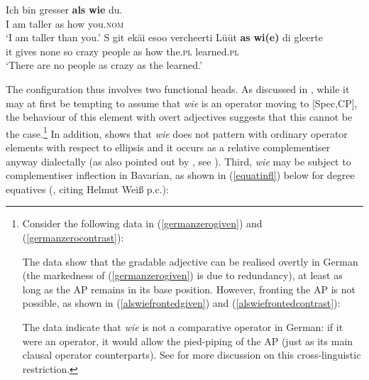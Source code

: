 \ea \label{alswiedistr}
\ea \gll Ich bin gresser \textbf{als} \textbf{wie} du.\\
I am taller as how you.\textsc{nom}\\
\glt `I am taller than you.'
\ex \gll S git ekäi esoo vercheerti Lüüt \textbf{as} \textbf{wi(e)} di gleerte\\
it gives none so crazy people as how the.\textsc{pl} learned.\textsc{pl}\\
\glt `There are no people as crazy as the learned.'
\z
\z

The configuration thus involves two functional heads. As discussed in , while it may at first be tempting to assume that \textit{wie} is an operator moving to [Spec,CP], the behaviour of this element with overt adjectives suggests that this cannot be the case.\footnote{Consider the following data in (\ref{germanzerogiven}) and (\ref{germanzerocontrast}):

\z

The data show that the gradable adjective can be realised overtly in German (the markedness of (\ref{germanzerogiven}) is due to redundancy), at least as long as the AP remains in its base position. However, fronting the AP is not possible, as shown in (\ref{alswiefrontedgiven}) and (\ref{alswiefrontedcontrast}):

\z

The data indicate that \textit{wie} is not a comparative operator in German: if it were an operator, it would allow the pied-piping of the AP (just as its main clausal operator counterparts). See \citet[92--100]{bacskaiatkari2018langsci} for more discussion on this cross-linguistic restriction.} In addition, \citet[467--470]{jaeger2018} shows that \textit{wie} does not pattern with ordinary operator elements with respect to ellipsis and it occurs as a relative complementiser anyway dialectally (as also pointed out by \citealt{brandnerbraeuning2013}, see ). Third, \textit{wie} may be subject to complementiser inflection in Bavarian, as shown in (\ref{equatinfl}) below for degree equatives (\citealt[328, ex. 537a]{jaeger2018}, citing Helmut Weiß p.c.):

